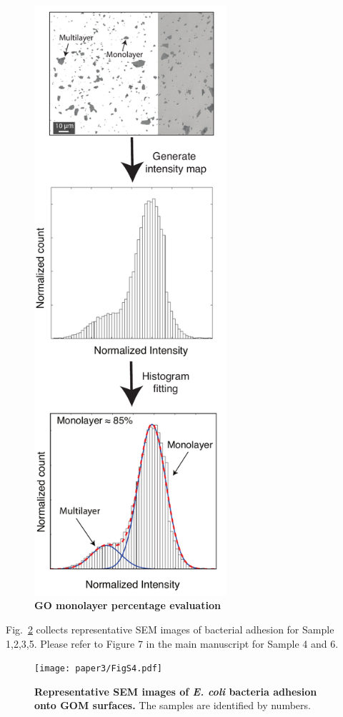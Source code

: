 \begin{figure}[t!]
  \centering
  \includegraphics[width=2.8in]{paper3/FigS3.pdf}
  \caption{\textbf{GO monolayer percentage evaluation}}
  \label{figS3_AppA}
\end{figure}

Fig.~\ref{figS4_AppA} collects representative SEM images of bacterial adhesion for Sample 1,2,3,5. Please refer to Figure 7 in the main manuscript for Sample 4 and 6.

\begin{figure}[h!]
  \centering
  \texttt{[image: paper3/FigS4.pdf]}
  \caption{\textbf{Representative SEM images of \textit{E. coli} bacteria adhesion onto GOM surfaces.} The samples are identified by numbers.}
  \label{figS4_AppA}
\end{figure}



